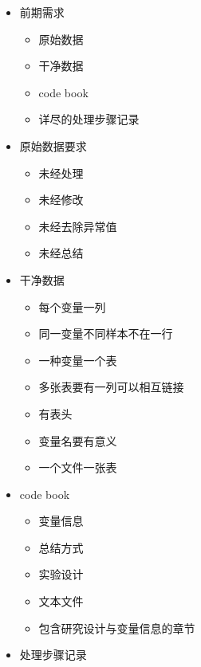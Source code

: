 \documentclass[]{book}
\providecommand{\tightlist}{%
  \setlength{\itemsep}{0pt}\setlength{\parskip}{0pt}}
\begin{document}
\begin{itemize}
\tightlist
\item
  前期需求

  \begin{itemize}
  \tightlist
  \item
    原始数据
  \item
    干净数据
  \item
    code book
  \item
    详尽的处理步骤记录
  \end{itemize}
\item
  原始数据要求

  \begin{itemize}
  \tightlist
  \item
    未经处理
  \item
    未经修改
  \item
    未经去除异常值
  \item
    未经总结
  \end{itemize}
\item
  干净数据

  \begin{itemize}
  \tightlist
  \item
    每个变量一列
  \item
    同一变量不同样本不在一行
  \item
    一种变量一个表
  \item
    多张表要有一列可以相互链接
  \item
    有表头
  \item
    变量名要有意义
  \item
    一个文件一张表
  \end{itemize}
\item
  code book

  \begin{itemize}
  \tightlist
  \item
    变量信息
  \item
    总结方式
  \item
    实验设计
  \item
    文本文件
  \item
    包含研究设计与变量信息的章节
  \end{itemize}
\item
  处理步骤记录


\end{itemize}
\end{document}
